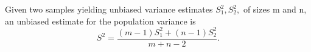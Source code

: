  Given two samples yielding unbiased variance estimates $ S_1 ^2 , S_2 ^2 , $
of sizes m and n, an unbiased estimate for the population variance is
\[ S^2 = \frac{(m-1)S_1 ^2 + (n-1)S_2 ^2 }{m+n-2} . \]
